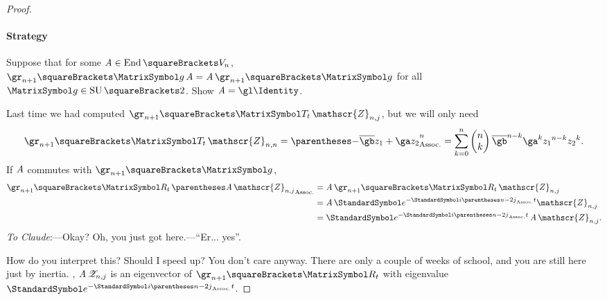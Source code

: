 \documentclass[10pt, a4paper, twoside]{lecturenotes}
\newcommand{\cz}{\mathscr{Z}}
\begin{document}
\begin{theorem}
\begin{proof}
\paragraph*{Strategy} Suppose that for some $\opA\in\Endomorphisms\of{V_n}$, $\irrep{n+1}[\matg]\opA = \opA\irrep{n+1}[\matg]$ for all $\matg\in\SpecialUnitaryGroup\of 2$. Show $\opA=\gl\Identity$.

\NewLecture[date=2013-05-16]
Last time we had computed $\irrep{n+1}[\matT_t]\cz_{n,j}$, but we will only need \[
\irrep{n+1}[\matT_t]\cz_{n,n}=\pa{-\conj\gb z_1 + \ga z_2}^n = \sum{k=0}[n] \binom{n}{k} \conj\gb^{n-k}\ga^k {z_1}^{n-k} {z_2}^k\text.\]
If $\operatorname{\mathit{A}}$ commutes with $\irrep{n+1}[\matg]$,
\begin{align*}
\irrep{n+1}[\matR_t]\pa{\opA\cz_{n,j}}
&= \opA\irrep{n+1}[\matR_t]\cz_{n,j}\\
&= \opA\E^{-\I\pa{n-2j}t}\cz_{n,j}\\
&= \E^{-\I\pa{n-2j}t}\opA\cz_{n,j}\text.
\end{align*}
\emph{To Claude}:---Okay? Oh, you just got here.---``Er... yes''.

How do you interpret this? Should I speed up? You don't care anyway.
There are only a couple of weeks of school, and you are still here just by inertia.
, $\opA\cz_{n,j}$ is an eigenvector of $\irrep{n+1}[\matR_t]$ with eigenvalue $\E^{-\I\pa{n-2j}t}$.


\end{proof}
\end{theorem}
\end{document}

